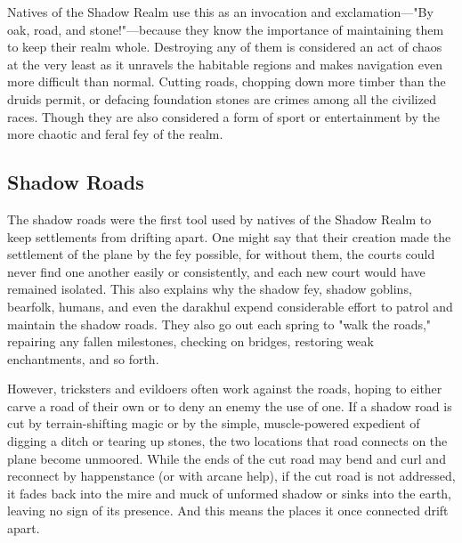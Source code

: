 \documentclass[10pt,a4paper,twoside,bg=print,twocolumn,openany,nodeprecatedcode]{dndbook}
\begin{document}
Natives of the Shadow Realm use this as an invocation and exclamation—"By oak, road, and stone!"—because they know the importance of maintaining them to keep their realm whole. Destroying any of them is considered an act of chaos at the very least as it unravels the habitable regions and makes navigation even more difficult than normal. Cutting roads, chopping down more timber than the druids permit, or defacing foundation stones are crimes among all the civilized races. Though they are also considered a form of sport or entertainment by the more chaotic and feral fey of the realm.

\subsection{Shadow Roads}
The shadow roads were the first tool used by natives of the Shadow Realm to keep settlements from drifting apart. One might say that their creation made the settlement of the plane by the fey possible, for without them, the courts could never find one another easily or consistently, and each new court would have remained isolated. This also explains why the shadow fey, shadow goblins, bearfolk, humans, and even the darakhul expend considerable effort to patrol and maintain the shadow roads. They also go out each spring to "walk the roads," repairing any fallen milestones, checking on bridges, restoring weak enchantments, and so forth.

However, tricksters and evildoers often work against the roads, hoping to either carve a road of their own or to deny an enemy the use of one. If a shadow road is cut by terrain-shifting magic or by the simple, muscle-powered expedient of digging a ditch or tearing up stones, the two locations that road connects on the plane become unmoored. While the ends of the cut road may bend and curl and reconnect by happenstance (or with arcane help), if the cut road is not addressed, it fades back into the mire and muck of unformed shadow or sinks into the earth, leaving no sign of its presence. And this means the places it once connected drift apart.
\end{document}

